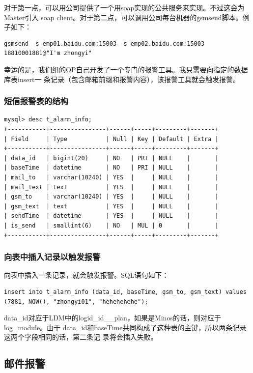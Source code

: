 \documentclass[11pt]{article}
\begin{document}
对于第一点，可以用公司提供了一个用soap实现的公共服务来实现。不过这会为Master引入
soap client。对于第二点，可以调用公司每台机器的gsmsend脚本。例子如下：
\begin{verbatim}
gsmsend -s emp01.baidu.com:15003 -s emp02.baidu.com:15003 18810001881@"I'm zhongyi"
\end{verbatim}

幸运的是，我们组的OP自己开发了一个专门的报警工具。我只需要向指定的数据库表insert一
条记录（包含邮箱前缀和报警内容），该报警工具就会触发报警。

\subsubsection{短信报警表的结构}
\label{sec-5-4-1}
\begin{verbatim}
mysql> desc t_alarm_info;
+-----------+----------------+------+-----+---------+-------+
| Field     | Type           | Null | Key | Default | Extra |
+-----------+----------------+------+-----+---------+-------+
| data_id   | bigint(20)     | NO   | PRI | NULL    |       |
| baseTime  | datetime       | NO   | PRI | NULL    |       |
| mail_to   | varchar(10240) | YES  |     | NULL    |       |
| mail_text | text           | YES  |     | NULL    |       |
| gsm_to    | varchar(10240) | YES  |     | NULL    |       |
| gsm_text  | text           | YES  |     | NULL    |       |
| sendTime  | datetime       | YES  |     | NULL    |       |
| is_send   | smallint(6)    | NO   | MUL | 0       |       |
+-----------+----------------+------+-----+---------+-------+
\end{verbatim}
\subsubsection{向表中插入记录以触发报警}
\label{sec-5-4-2}
向表中插入一条记录，就会触发报警。SQL语句如下：
\begin{verbatim}
insert into t_alarm_info (data_id, baseTime, gsm_to, gsm_text) values (7881, NOW(), "zhongyi01", "hehehehehe");
\end{verbatim}

data\_id对应于LDM中的logid\_id\_\_plan，如果是Minos的话，则对应于log\_module。由于
data\_id和baseTime共同构成了这种表的主键，所以两条记录这两个字段相同的话，第二条记
录将会插入失败。
\subsection{邮件报警}
\label{sec-5-5}
\end{document}

